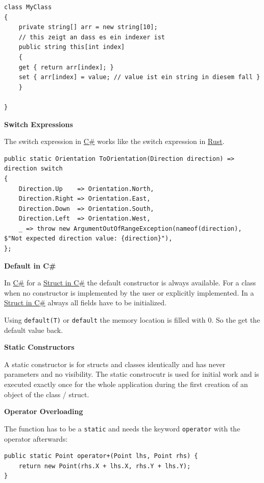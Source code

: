 \documentclass[11pt,twoside,landscape]{article}
\begin{document}
\begin{multicols}{3}
\begin{lstlisting}
class MyClass
{
    private string[] arr = new string[10];
    // this zeigt an dass es ein indexer ist
    public string this[int index]
    {
	get { return arr[index]; }
	set { arr[index] = value; // value ist ein string in diesem fall }
    }

}
\end{lstlisting}

\textbf{Switch Expressions}

The switch expression in \href{../../../roam/20211003114158-c.org}{C\#} works like the switch expression in \href{../../../roam/20200904153952-rust.org}{Rust}.

\lstset{language=csharp,label= ,caption= ,captionpos=b,numbers=none}
\begin{lstlisting}
public static Orientation ToOrientation(Direction direction) => direction switch
{
    Direction.Up    => Orientation.North,
    Direction.Right => Orientation.East,
    Direction.Down  => Orientation.South,
    Direction.Left  => Orientation.West,
    _ => throw new ArgumentOutOfRangeException(nameof(direction), $"Not expected direction value: {direction}"),
};
\end{lstlisting}

\textbf{Default in C\#}

In \href{../../../roam/20211003114158-c.org}{C\#} for a \href{../../../roam/20211008085202-struct_in_c.org}{Struct in C\#} the default constructor is always available.
For a class when no constructor is implemented by the user or explicitly implemented.
In a \href{../../../roam/20211008085202-struct_in_c.org}{Struct in C\#} always all fields have to be initialized.

Using \texttt{default(T)} or \texttt{default} the memory location is filled with 0.
So the get the default value back.

\textbf{Static Constructors}

A static constructor is for structs and classes identically and has never parameters and no visibility.
The static constrocutr is used for initial work and is executed exactly once for the whole application during the first creation of an object of the class / struct.

\textbf{Operator Overloading}

The function has to be a \texttt{static} and needs the keyword \texttt{operator} with the operator afterwards:
\lstset{language=csharp,label= ,caption= ,captionpos=b,numbers=none}
\begin{lstlisting}
public static Point operator+(Point lhs, Point rhs) {
    return new Point(rhs.X + lhs.X, rhs.Y + lhs.Y);
}
\end{lstlisting}


\end{multicols}
\end{document}
